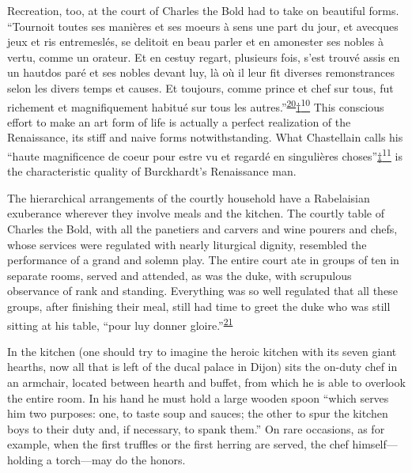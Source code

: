 Recreation, too, at the court of Charles the Bold had to take on
beautiful forms. ``Tournoit toutes ses manières et ses moeurs à sens une
part du jour, et avecques jeux et ris entremeslés, se delitoit en beau
parler et en amonester ses nobles à vertu, comme un orateur. Et en
cestuy regart, plusieurs fois, s'est trouvé assis en un hautdos paré et
ses nobles devant luy, là où il leur fit diverses remonstrances selon
les divers temps et causes. Et toujours, comme prince et chef sur tous,
fut richement et magnifiquement habitué sur tous les
autres.''\textsuperscript{\protect\hypertarget{09_Chapter_Two__THE_CRAVING_FOR_A_M.xhtmlux5cux23id_2047}{\protect\hyperlink{23_NOTES.xhtmlux5cux23id_2048}{20}}}\protect\hypertarget{09_Chapter_Two__THE_CRAVING_FOR_A_M.xhtmlux5cux23id_2429}{\protect\hyperlink{23_NOTES.xhtmlux5cux23id_2430}{†\textsuperscript{10}}}
This conscious effort to make an art form of life is actually a perfect
realization of the Renaissance, its stiff and naive forms
notwithstanding. What Chastellain calls his ``haute magnificence de
coeur pour estre vu et regardé en singulières
choses''\protect\hypertarget{09_Chapter_Two__THE_CRAVING_FOR_A_M.xhtmlux5cux23id_2431}{\protect\hyperlink{23_NOTES.xhtmlux5cux23id_2432}{‡\textsuperscript{11}}}
is the characteristic quality of Burckhardt's Renaissance man.

The hierarchical arrangements of the courtly household have a
Rabelaisian exuberance wherever they involve meals and the kitchen. The
courtly table of Charles the Bold, with all the panetiers and carvers
and wine pourers and chefs, whose services were regulated with nearly
liturgical dignity, resembled the performance
\protect\hypertarget{09_Chapter_Two__THE_CRAVING_FOR_A_M.xhtmlux5cux23page_44}{}{}of
a grand and solemn play. The entire court ate in groups of ten in
separate rooms, served and attended, as was the duke, with scrupulous
observance of rank and standing. Everything was so well regulated that
all these groups, after finishing their meal, still had time to greet
the duke who was still sitting at his table, ``pour luy donner
gloire.''\textsuperscript{\protect\hypertarget{09_Chapter_Two__THE_CRAVING_FOR_A_M.xhtmlux5cux23id_2045}{\protect\hyperlink{23_NOTES.xhtmlux5cux23id_2046}{21}}}

In the kitchen (one should try to imagine the heroic kitchen with its
seven giant hearths, now all that is left of the ducal palace in Dijon)
sits the on-duty chef in an armchair, located between hearth and buffet,
from which he is able to overlook the entire room. In his hand he must
hold a large wooden spoon ``which serves him two purposes: one, to taste
soup and sauces; the other to spur the kitchen boys to their duty and,
if necessary, to spank them.'' On rare occasions, as for example, when
the first truffles or the first herring are served, the chef
himself---holding a torch---may do the honors.

